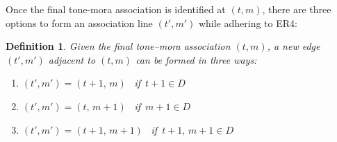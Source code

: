 \documentclass{CUP-JNL-PHO}%
\theoremstyle{definition}
\numberwithin{equation}{section}
\theoremstyle{definition}
\newtheorem{definition}{Definition}[section]
\begin{document}
Once the final tone-mora association is identified at $(t, m)$, there are 
three options to form an association line $(t', m')$ while adhering to ER4:


\begin{definition}
	\textit{
		Given the final tone--mora association $(t,m)$, a new edge $(t',m')$
		adjacent to $(t,m)$ can be formed in three ways:}
	\begin{enumerate}[label = \alph*.]
		\setlength\itemsep{0em} \setlength\parskip{0em}
		\item $(t', m') = (t{+}1,\, m)$ \qquad\, \textit{if} $\, t{+}1 \in D$  
		\item $(t', m') = (t,\, m{+}1)$ \qquad\, \textit{if} $\, m{+}1 \in D$  
		\item $(t', m') = (t{+}1,\, m{+}1)$ \quad\, \textit{if} $ \, t{+}1,\, m{+}1 \in D$
	\end{enumerate}
	\label{newassoc}
\end{definition} 
\end{document}
